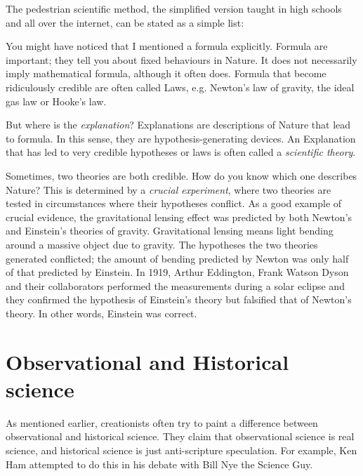\begin{multicols}{2}
The pedestrian scientific method, the simplified version taught in high schools and all over the internet, can be stated as a simple list:
 

You might have noticed that I mentioned a formula explicitly. Formula are important; they tell you about fixed behaviours in Nature. It does not necessarily imply mathematical formula, although it often does. Formula that become ridiculously credible are often called Laws, e.g. Newton's law of gravity, the ideal gas law or Hooke's law.

But where is the \emph{explanation}? Explanations are descriptions of Nature that lead to formula. In this sense, they are hypothesis-generating devices. An Explanation that has led to very credible hypotheses or laws is often called a \emph{scientific theory}.

Sometimes, two theories are both credible. How do you know which one describes Nature? This is determined by a \emph{crucial experiment}, where two theories are tested in circumstances where their hypotheses conflict. As a good example of crucial evidence, the gravitational lensing effect was predicted by both Newton's and Einstein's theories of gravity. Gravitational lensing means light bending around a massive object due to gravity. The hypotheses the two theories generated conflicted; the amount of bending predicted by Newton was only half of that predicted by Einstein. In 1919, Arthur Eddington, Frank Watson Dyson and their collaborators performed the measurements during a solar eclipse and they confirmed the hypothesis of Einstein's theory but falsified that of Newton's theory. In other words, Einstein was correct.

\section{Observational and Historical science}

As mentioned earlier, creationists often try to paint a difference between observational and historical science. They claim that observational science is real science, and historical science is just anti-scripture speculation. For example, Ken Ham attempted to do this in his debate with Bill Nye the Science Guy.


\end{multicols}
